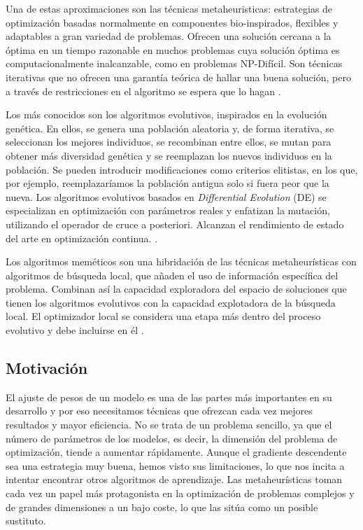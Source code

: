 Una de estas aproximaciones son las técnicas metaheuristicas: estrategias de optimización basadas normalmente en componentes bio-inspirados, flexibles y adaptables a gran variedad de problemas. Ofrecen una solución cercana a la óptima en un tiempo razonable en muchos problemas cuya solución óptima es computacionalmente inalcanzable, como en problemas NP-Difícil. Son técnicas iterativas que no ofrecen una garantía teórica de hallar una buena solución, pero a través de restricciones en el algoritmo se espera que lo hagan \cite{MHDef}.

Los más conocidos son los algoritmos evolutivos, inspirados en la evolución genética. En ellos, se genera una población aleatoria y, de forma iterativa, se seleccionan los mejores individuos, se recombinan entre ellos, se mutan para obtener más diversidad genética y se reemplazan los nuevos individuos en la población. Se pueden introducir modificaciones como criterios elitistas, en los que, por ejemplo, reemplazaríamos la población antigua solo si fuera peor que la nueva. Los algoritmos evolutivos basados en \textit{Differential Evolution} (DE) se especializan en optimización con parámetros reales y enfatizan la mutación, utilizando el operador de cruce a posteriori. Alcanzan el rendimiento de estado del arte en optimización continua. \cite{MHoverview}.

Los algoritmos meméticos son una hibridación de las técnicas metaheurísticas con algoritmos de búsqueda local, que añaden el uso de información específica del problema. Combinan así la capacidad exploradora del espacio de soluciones que tienen los algoritmos evolutivos con la capacidad explotadora de la búsqueda local. El optimizador local se considera una etapa más dentro del proceso evolutivo y debe incluirse en él \cite{MHDef}.



\subsection{Motivación}
\label{sec:motinfo}

El ajuste de pesos de un modelo es una de las partes más importantes en su desarrollo y por eso necesitamos técnicas que ofrezcan cada vez mejores resultados y mayor eficiencia. No se trata de un problema sencillo, ya que el número de parámetros de los modelos, es decir, la dimensión del problema de optimización, tiende a aumentar rápidamente. Aunque el gradiente descendente sea una estrategia muy buena, hemos visto sus limitaciones, lo que nos incita a intentar encontrar otros algoritmos de aprendizaje. Las metaheurísticas toman cada vez un papel más protagonista en la optimización de problemas complejos y de grandes dimensiones a un bajo coste, lo que las sitúa como un posible sustituto.

